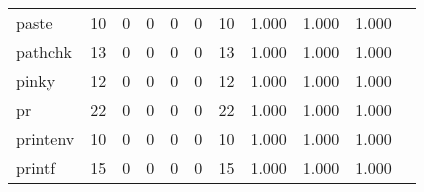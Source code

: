 \begin{longtable}{lp{1.20cm}p{1.20cm}p{1.20cm}p{1.20cm}p{1.20cm}p{1.20cm}p{1.20cm}p{1.20cm}p{1.20cm}p{1.20cm}}
paste     &                                    10 &                                                  0 &                                                  0 &                                                  0 &                                                  0 &                                                 10 &                                         1.000 &                                              1.000 &                                              1.000 \\
pathchk   &                                    13 &                                                  0 &                                                  0 &                                                  0 &                                                  0 &                                                 13 &                                         1.000 &                                              1.000 &                                              1.000 \\
pinky     &                                    12 &                                                  0 &                                                  0 &                                                  0 &                                                  0 &                                                 12 &                                         1.000 &                                              1.000 &                                              1.000 \\
pr        &                                    22 &                                                  0 &                                                  0 &                                                  0 &                                                  0 &                                                 22 &                                         1.000 &                                              1.000 &                                              1.000 \\
printenv  &                                    10 &                                                  0 &                                                  0 &                                                  0 &                                                  0 &                                                 10 &                                         1.000 &                                              1.000 &                                              1.000 \\
printf    &                                    15 &                                                  0 &                                                  0 &                                                  0 &                                                  0 &                                                 15 &                                         1.000 &                                              1.000 &                                              1.000 \\

\end{longtable}
